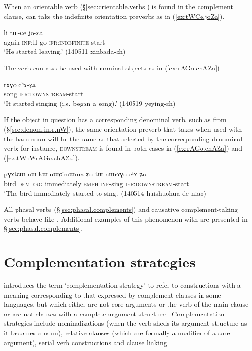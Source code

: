 When an orientable verb (§\ref{sec:orientable.verbs}) is found in the complement clause,  can take the indefinite orientation preverbs as in (\ref{ex:tWCe.joZa}).

\begin{exe} 
\ex \label{ex:tWCe.joZa}
\gll li tɯ-ɕe jo-ʑa \\
again \textsc{inf}:II-go \textsc{ifr}:\textsc{indefinite}-start \\
\glt `He started leaving.' (140511 xinbada-zh)
\end{exe} 

The verb  can also be used with nominal objects as in (\ref{ex:rAGo.chAZa}). 

\begin{exe}
\ex \label{ex:rAGo.chAZa}
\gll rɤɣo cʰɤ-ʑa \\
song \textsc{ifr}:\textsc{downstream}-start \\
\glt `It started singing (i.e. began a song).' (140519 yeying-zh)
\end{exe}

If the object in question has a corresponding denominal verb, such as  from  (§\ref{sec:denom.intr.nW}), the same orientation preverb that  takes when used with the base noun will be the same as that selected by the corresponding denominal verb: for instance, \textsc{downstream} is found in both cases in (\ref{ex:rAGo.chAZa}) and (\ref{ex:tWnWrAGo.chAZa}).


\begin{exe}
\ex \label{ex:tWnWrAGo.chAZa}
\gll pɣɤtɕɯ nɯ kɯ nɯɕimɯma ʑo tɯ-nɯrɤɣo cʰɤ-ʑa  \\
bird \textsc{dem} \textsc{erg} immediately \textsc{emph} \textsc{inf}-sing \textsc{ifr}:\textsc{downstream}-start \\
\glt `The bird immediately started to sing.' (140514 huishuohua de niao)
\end{exe}

All phasal verbs (§\ref{sec:phasal.complements}) and causative com\-ple\-ment-taking verbs behave like . Additional examples of this phenomenon with  are presented in §\ref{sec:phasal.complements}.


\section{Complementation strategies}  \label{sec:strategies}
\citet{dixon06complementation} introduces the term `complementation strategy' to refer to constructions with a meaning corresponding to that expressed by complement clauses in some languages, but which either are not core arguments or the verb of the main clause or are not clauses with a complete argument structure \citep[34--40]{dixon06complementation}. Complementation strategies include nominalizations (when the verb sheds its argument structure as it becomes a noun), relative clauses (which are formally a modifier of a core argument), serial verb constructions and clause linking.


